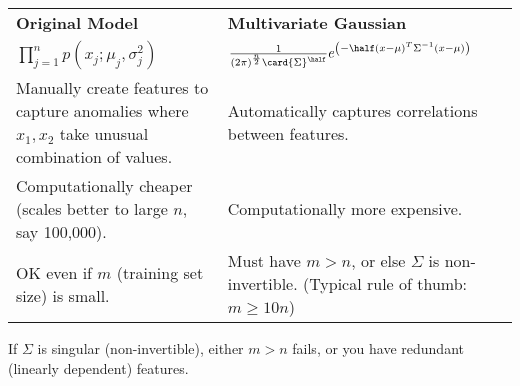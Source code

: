 \begin{tabularx}{0.9\linewidth}{X | X}
    \textbf{Original Model}                                            &
    \textbf{Multivariate Gaussian}                                            \\
    $\prod_{j=1}^n p(x_j; \mu_j, \sigma^2_j)$                          &
    $ \frac{1}{(2\pi)^{\frac{n}{2}}\card{\Sigma}^\half}
    e^{\left(-\half\left(x-\mu\right)^T\Sigma^{-1}\left(x-\mu\right)\right)}$ \\
    Manually create features to capture anomalies where $x_1, x_2$ take unusual
    combination of values.                                             &
    Automatically captures correlations between features.                     \\
    Computationally cheaper (scales better to large $n$, say 100,000). &
    Computationally more expensive.                                           \\
    OK even if $m$ (training set size) is small.                       &
    Must have $m > n$, or else $\Sigma$ is non-invertible.
    (Typical rule of thumb: $m \ge 10n$)                                      \\
\end{tabularx}

\begin{remark}
    If $\Sigma$ is singular (non-invertible), either $m > n$ fails, or
    you have redundant (linearly dependent) features.
\end{remark}

